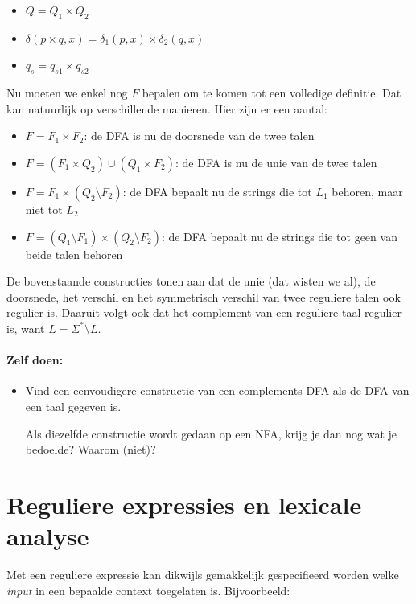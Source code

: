 \begin{itemize}
\item $Q = Q_1 \times Q_2$
\item $\delta(p \times q,x) = \delta_1(p,x) \times \delta_2(q,x)$
\item $q_s = q_{s1} \times q_{s2}$
\end{itemize}

Nu moeten we enkel nog $F$ bepalen om te komen tot een volledige
definitie. Dat kan natuurlijk op verschillende manieren. Hier zijn er
een aantal:

\begin{itemize}
\item $F = F_1 \times F_2$: de DFA is nu de doorsnede van de twee talen
\item $F = (F_1 \times Q_2) \cup (Q_1 \times F_2)$: de DFA is nu de unie
van de twee talen
\item $F = F_1 \times (Q_2 \setminus F_2)$: de DFA bepaalt nu de strings die
tot $L_1$ behoren, maar niet tot $L_2$
\item $F = (Q_1 \setminus F_1) \times (Q_2 \setminus F_2)$: de DFA bepaalt nu de
strings die tot geen van beide talen behoren
\end{itemize}

De bovenstaande constructies tonen aan dat de unie (dat wisten we al),
de doorsnede, het verschil en het symmetrisch verschil van twee
reguliere talen ook regulier is. Daaruit volgt ook dat het complement
van een reguliere taal regulier is, want
%
$\overline{L} = \Sigma^* \setminus L$.

\paragraph{Zelf doen:}
\begin{itemize}
\item[]
Vind een eenvoudigere constructie van een complements-DFA als de DFA
van een taal gegeven is.

Als diezelfde constructie wordt gedaan op een NFA, krijg je dan nog
wat je bedoelde? Waarom (niet)?
\end{itemize}






\clearpage
\section{Reguliere expressies en lexicale analyse}


Met een reguliere expressie kan dikwijls gemakkelijk gespecifieerd
worden welke {\em input} in een bepaalde context toegelaten
is. Bijvoorbeeld: 


